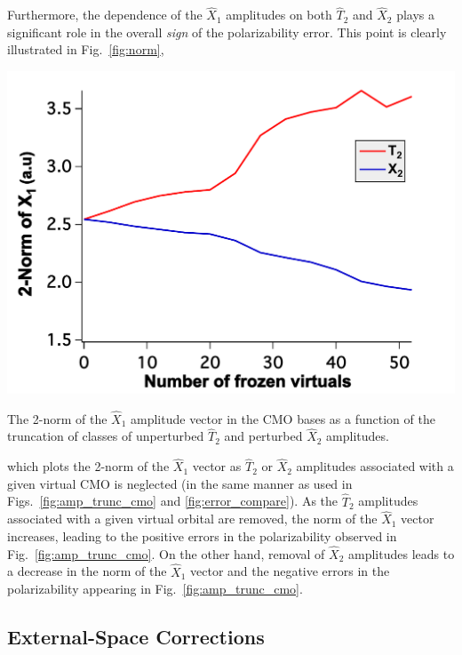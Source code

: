 Furthermore, the dependence of the $\hat{X}_1$ amplitudes on both $\hat{T}_2$
and $\hat{X}_2$ plays a significant role in the overall {\em sign} of the
polarizability error.  This point is clearly illustrated in
Fig.~\ref{fig:norm}, 
\begin{MyFigure}[h!]
\centering
\includegraphics[width=0.6\linewidth,natwidth=610,natheight=642]{figures_fvno/norm.pdf}
\caption{{\footnotesize The 2-norm of the $\hat{X}_1$ amplitude vector in
the CMO bases as a function of the truncation of classes of unperturbed
$\hat{T}_2$ and perturbed $\hat{X}_2$ amplitudes. }}
\label{fig:norm}
\end{MyFigure}
which plots the 2-norm of the $\hat{X}_1$ vector as
$\hat{T}_2$ or $\hat{X}_2$ amplitudes associated with a given virtual CMO is
neglected (in the same manner as used in Figs.~\ref{fig:amp_trunc_cmo} and
\ref{fig:error_compare}). As the $\hat{T}_2$ amplitudes associated with a given
virtual orbital are removed, the norm of the $\hat{X}_1$ vector
increases, leading to the positive errors in the polarizability observed in
Fig.~\ref{fig:amp_trunc_cmo}.  On the other hand, removal of $\hat{X}_2$
amplitudes leads to a decrease in the norm of the $\hat{X}_1$ vector and
the negative errors in the polarizability appearing in
Fig.~\ref{fig:amp_trunc_cmo}.

\subsection{External-Space Corrections}

